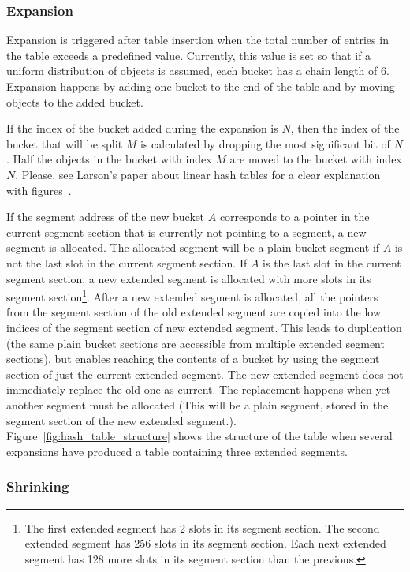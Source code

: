 \documentclass[aps,pre,preprint,nofootinbib]{revtex4}
\begin{document}
\subsubsection{Expansion}

Expansion is triggered after table insertion when the total number of entries in the table exceeds a predefined value.
Currently, this value is set so that if a uniform distribution of objects is assumed, each bucket has a chain length of 6.
Expansion happens by adding one bucket to the end of the table and by moving objects to the added bucket.

If the index of the bucket added during the expansion is $N$, then the index of the bucket that will be split $M$ is calculated by dropping the most significant bit of $N$.
Half the objects in the bucket with index  $M$ are moved to the bucket with index $N$.
Please, see Larson's paper about linear hash tables for a clear explanation with figures~\cite{Larson}.

If the segment address of the new bucket $A$ corresponds to a pointer in the current segment section that is currently not pointing to a segment, a new segment is allocated.
The allocated segment will be a plain bucket segment if $A$ is not the last slot in the current segment section.
If $A$ is the last slot in the current segment section, a new extended segment is allocated with more slots in its segment section\footnote{
  The first extended segment has 2 slots in its segment section.
  The second extended segment has 256 slots in its segment section.
  Each next extended segment has 128 more slots in its segment section than the previous.
}.
After a new extended segment is allocated, all the pointers from the segment section of the old extended segment are copied into the low indices of the segment section of new extended segment.
This leads to duplication (the same plain bucket sections are accessible from multiple extended segment sections), but enables reaching the contents of a bucket by using the segment section of just the current extended segment.
The new extended segment does not immediately replace the old one as current.
The replacement happens when yet another segment must be allocated
(This will be a plain segment, stored in the segment section of the new extended segment.).
Figure~\ref{fig:hash_table_structure} shows the structure of the table when several expansions have produced a table containing three extended segments. 

\subsubsection{Shrinking}
\end{document}
